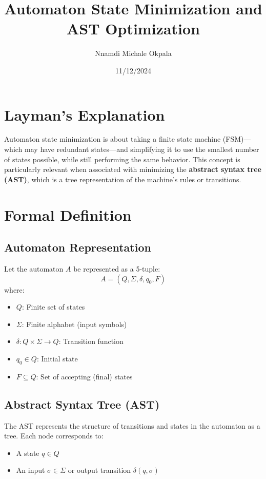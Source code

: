 \documentclass{article}
\title{Automaton State Minimization and AST Optimization}
\author{Nnamdi Michale Okpala}
\date{11/12/2024}
\begin{document}
\maketitle

\section{Layman's Explanation}
Automaton state minimization is about taking a finite state machine (FSM)---which may have redundant states---and simplifying it to use the smallest number of states possible, while still performing the same behavior. This concept is particularly relevant when associated with minimizing the \textbf{abstract syntax tree (AST)}, which is a tree representation of the machine's rules or transitions.

\section{Formal Definition}

\subsection{Automaton Representation}
Let the automaton $A$ be represented as a 5-tuple:
\[
A = (Q, \Sigma, \delta, q_0, F)
\]
where:
\begin{itemize}
    \item $Q$: Finite set of states
    \item $\Sigma$: Finite alphabet (input symbols)
    \item $\delta: Q \times \Sigma \to Q$: Transition function
    \item $q_0 \in Q$: Initial state
    \item $F \subseteq Q$: Set of accepting (final) states
\end{itemize}

\subsection{Abstract Syntax Tree (AST)}
The AST represents the structure of transitions and states in the automaton as a tree. Each node corresponds to:
\begin{itemize}
    \item A state $q \in Q$
    \item An input $\sigma \in \Sigma$ or output transition $\delta(q, \sigma)$
\end{itemize}
\end{document}
